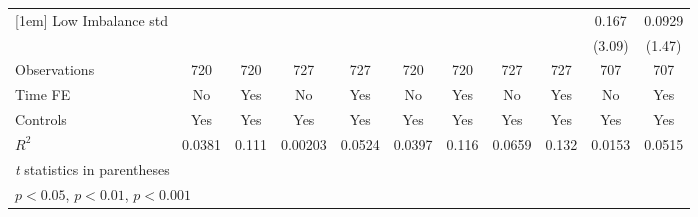 {\begin{tabular}{l*{10}{c}}
[1em]
Low Imbalance std&                  &                  &                  &                  &                  &                  &                  &                  &    0.167\sym{**} &   0.0929         \\
                &                  &                  &                  &                  &                  &                  &                  &                  &   (3.09)         &   (1.47)         \\
\hline
Observations    &      720         &      720         &      727         &      727         &      720         &      720         &      727         &      727         &      707         &      707         \\
Time FE         &       No         &      Yes         &       No         &      Yes         &       No         &      Yes         &       No         &      Yes         &       No         &      Yes         \\
Controls        &      Yes         &      Yes         &      Yes         &      Yes         &      Yes         &      Yes         &      Yes         &      Yes         &      Yes         &      Yes         \\
$ R^2 $         &   0.0381         &    0.111         &  0.00203         &   0.0524         &   0.0397         &    0.116         &   0.0659         &    0.132         &   0.0153         &   0.0515         \\
\hline\hline
\multicolumn{11}{l}{\footnotesize \textit{t} statistics in parentheses}\\
\multicolumn{11}{l}{\footnotesize \sym{*} \(p<0.05\), \sym{**} \(p<0.01\), \sym{***} \(p<0.001\)}\\
\end{tabular}
}

